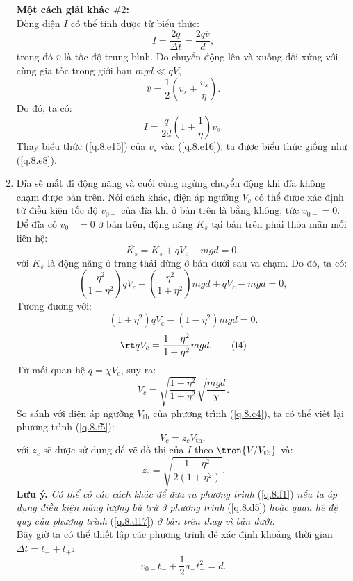 \begin{loigiai}
\begin{enumerate}[1)]
    \textbf{Một cách giải khác $\# 2$:}\\
    Dòng điện $I$ có thể tính được từ biểu thức:
    \[I=\dfrac{2 q}{\Delta t} = \dfrac{2 q \overline{{v}}}{d}, \tag{e14}\label{q.8.e14}\]
    trong đó $\overline{{v}}$ là tốc độ trung bình. Do chuyển động lên và xuống đối xứng với cùng gia tốc trong giới hạn $mgd \ll qV$, 
    \[\overline{{v}} =\dfrac{1}{2}\left(v_{s}+\dfrac{v_{s}}{\eta}\right).\tag{e15}\label{q.8.e15} \]
    Do đó, ta có:
    \[I=\dfrac{q}{2 d}\left(1+\dfrac{1}{\eta}\right) {v}_{{s}}. \tag{e16}\label{q.8.e16}\]
    Thay biểu thức (\ref{q.8.e15}) của $v_s$ vào (\ref{q.8.e16}), ta được biểu thức giống như (\ref{q.8.e8}).
    \item Đĩa sẽ mất đi động năng và cuối cùng ngừng chuyển động khi đĩa không chạm được bản trên. Nói cách khác, điện áp ngưỡng $V_c$ có thể được xác định từ điều kiện tốc độ $v_{0-}$ của đĩa khi ở bản trên là bằng không, tức $v_{0-} = 0$.\\
    Để đĩa có $v_{0-} = 0$ ở bản trên, động năng $\overline{K_s}$ tại bản trên phải thỏa mãn mối liên hệ:
    \[\overline{K_s} = K_{{s}}+q V_{c}-m g d=0, \tag{f1}\label{q.8.f1}\]
    với $K_s$ là động năng ở trạng thái dừng ở bản dưới sau va chạm. Do đó, ta có:
    \[\left(\dfrac{\eta^{2}}{1-\eta^{2}}\right) q V_{c}+\left(\dfrac{\eta^{2}}{1+\eta^{2}}\right) m g d+q V_{c}-m g d=0, \tag{f2}\label{q.8.f2}\]
    Tương đương với:
    \[\left(1+\eta^{2}\right) q V_{c}-\left(1-\eta^{2}\right) m g d=0. \tag{f3}\label{q.8.f3}\]
    \[\rt q V_{{c}}=\dfrac{1-\eta^{2}}{1+\eta^{2}} m g d.\tag{f4}\label{q.8.f4} \]
    Từ mối quan hệ $q=\chi V_{{c}}$, suy ra:
    \[V_{{c}}=\sqrt{\dfrac{1-\eta^{2}}{1+\eta^{2}}} \sqrt{\dfrac{m g d}{\chi}}.\tag{f5}\label{q.8.f5} \]
    So sánh với điện áp ngưỡng $V_{\mathrm{th}}$ của phương trình (\ref{q.8.c4}), ta có thể viết lại phương trình (\ref{q.8.f5}):
    \[V_{c} = z_{c} V_{\mathrm{th}},\tag{f6}\label{q.8.f6} \]
    với $z_c$ sẽ được sử dụng để vẽ đồ thị của $I$ theo $\tron{V/V_{\mathrm{th}}}$ và:
    \[z_{c} = \sqrt{\dfrac{1-\eta^{2}}{2\left(1+\eta^{2}\right)}}. \tag{f7}\label{q.8.f7}\]
    \textbf{Lưu ý.} \textit{Có thể có các cách khác để đưa ra phương trình}  (\ref{q.8.f1}) \textit{nếu ta áp dụng điều kiện năng lượng bù trừ ở phương trình} (\ref{q.8.d5}) \textit{hoặc quan hệ đệ quy của phương trình} (\ref{q.8.d17}) \textit{ở bản trên thay vì bản dưới.}\\
    Bây giờ ta có thể thiết lập các phương trình để xác định khoảng thời gian $\Delta t = t_- + t_+$:
    \[
    {v}_{0-} t_{-} + \dfrac{1}{2} a_{-} t_{-}^{2} = d.  \tag{f8}\label{q.8.f8}\]

\end{enumerate}
\end{loigiai}
